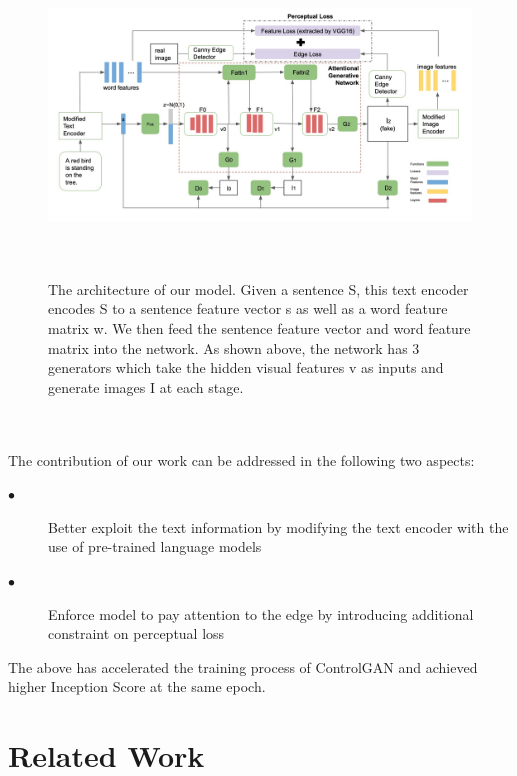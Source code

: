 \documentclass[10pt,twocolumn,letterpaper]{article}
\begin{document}
\begin{figure}
  \centering
  \includegraphics[width=6.5in,height=8.5cm]{1.jpeg}
  \caption{The architecture of our model. Given a sentence S, this text encoder encodes S to a sentence feature vector s as well as a word feature matrix w. We then feed the sentence feature vector and word feature matrix into the network. As shown above, the network has 3 generators which take the hidden visual features v as inputs and generate images I at each stage.}
  \label{ach}
\end{figure}

\\\\
\noindent The contribution of our work can be addressed in the following two aspects:
\begin{description}
  \item[$\bullet$] Better exploit the text information by modifying the text encoder with the use of pre-trained language models
  \item[$\bullet$] Enforce model to pay attention to the edge by introducing additional constraint on perceptual loss
\end{description}
The above has accelerated the training process of ControlGAN \cite{li2019controllable} and achieved higher Inception Score \cite{salimans2016improved} at the same epoch.

\section{Related Work}
\end{document}
